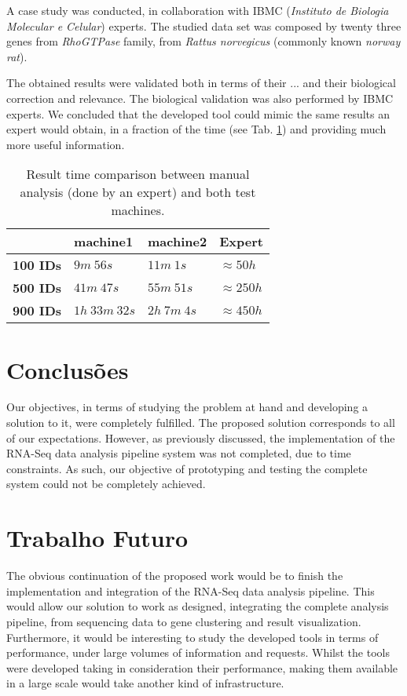 \documentclass[9pt,a4paper]{extarticle}
\begin{document}
\begin{multicols}{2}
A case study was conducted, in collaboration with IBMC (\emph{Instituto de
Biologia Molecular e Celular}) experts. The studied data set was composed by
twenty three genes from \emph{RhoGTPase} family, from \emph{Rattus norvegicus}
(commonly known \emph{norway rat}).

The obtained results were validated both in terms of their ... and their
biological correction and relevance. The biological validation was also
performed by IBMC experts. We concluded that the developed tool could mimic the
same results an expert would obtain, in a fraction of the time (see Tab.
\ref{tab:stress}) and providing much more useful information.

\begin{table}[H]
  \centering
  \caption{Result time comparison between manual analysis (done by an expert) and both test machines.}
  \begin{tabular}{l|lll}
    & \textbf{machine1} & \textbf{machine2} & \textbf{Expert} \\ \hline
    \textbf{100 IDs}   & $9m\ 56s$          & $11m\ 1s$      & $\approx 50h$\\
    \textbf{500 IDs}   & $41m\ 47s$         & $55m\ 51s$     & $\approx 250h$\\
    \textbf{900 IDs}   & $1h\ 33m\ 32s$     & $2h\ 7m\ 4s$   & $\approx 450h$\\
  \end{tabular}
  \label{tab:stress}
\end{table}

\section{Conclusões}

Our objectives, in terms of studying the problem at hand and developing a
solution to it, were completely fulfilled. The proposed solution corresponds to
all of our expectations. However, as previously discussed, the implementation of
the RNA-Seq data analysis pipeline system was not completed, due to time
constraints. As such, our objective of prototyping and testing the complete
system could not be completely achieved.

\section{Trabalho Futuro}

The obvious continuation of the proposed work would be to finish the
implementation and integration of the RNA-Seq data analysis pipeline. This would
allow our solution to work as designed, integrating the complete analysis
pipeline, from sequencing data to gene clustering and result visualization.
Furthermore, it would be interesting to study the developed tools in terms of
performance, under large volumes of information and requests. Whilst the tools
were developed taking in consideration their performance, making them available
in a large scale would take another kind of infrastructure.



\end{multicols}
\end{document}
